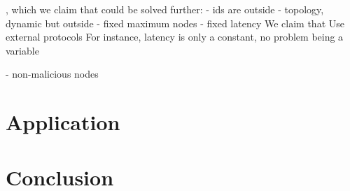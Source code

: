 \documentclass[10pt,journal,compsoc]{IEEEtran}
\begin{document}
, which we claim that could be
solved further:
- ids are outside
- topology, dynamic but outside
- fixed maximum nodes
- fixed latency
We claim that Use external protocols
For instance, latency is only a constant, no problem being a variable

- non-malicious nodes

\section{Application}
\label{sec.app}

\section{Conclusion}
\label{sec.conclusion}

\end{document}
